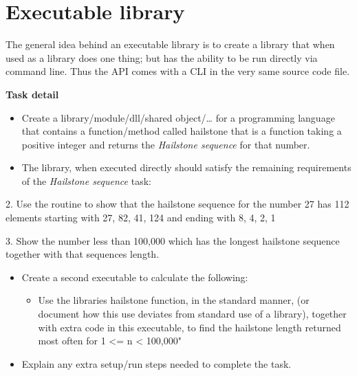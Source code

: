 \pagebreak{}
\section*{Executable library}

The general idea behind an executable library is to create a library
that when used as a library does one thing; but has the ability to be
run directly via command line. Thus the API comes with a CLI in the very
same source code file.

\textbf{Task detail}

\begin{itemize}
\item Create a library/module/dll/shared object/\ldots{} for a
  programming language that contains a function/method called
  hailstone that is a function taking a positive integer and returns
  the \emph{Hailstone sequence} for that number.
\end{itemize}

\begin{itemize}
\item The library, when executed directly should satisfy the remaining
  requirements of the \emph{Hailstone sequence} task:
\end{itemize}

2. Use the routine to show that the hailstone sequence for the number
27 has 112 elements starting with 27, 82, 41, 124 and ending with 8,
4, 2, 1

3. Show the number less than 100,000 which has the longest hailstone
sequence together with that sequences length.

\begin{itemize}
\item
  Create a second executable to calculate the following:

  \begin{itemize}
  \item
    Use the libraries hailstone function, in the standard manner, (or
    document how this use deviates from standard use of a library),
    together with extra code in this executable, to find the hailstone
    length returned most often for 1 \textless{}= n \textless{} 100,000"
  \end{itemize}
\end{itemize}

\begin{itemize}
\item
  Explain any extra setup/run steps needed to complete the task.
\end{itemize}

